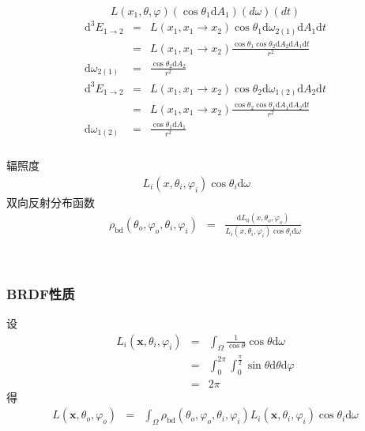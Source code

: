 \documentclass{beamer}
\newcommand{\mathd}{\mathrm{d}}
\newcommand{\nospace}{}
\newcommand{\tmmathbf}[1]{\ensuremath{\boldsymbol{#1}}}
\newcommand{\tmop}[1]{\ensuremath{\operatorname{#1}}}
\begin{document}
{{\begin{frame}
  \frametitle{}
  \[ L (x_1, \theta, \varphi) (\cos \theta_1 \mathd A_1) (d \omega) (d
     \nospace t) \]
  \begin{eqnarray*}
    \mathd^3 E_{1 \rightarrow 2} & = & L (x_1, x_1 \rightarrow x_2) \cos
    \theta_1 \mathd \omega_{2 (1)} \mathd A_1 \mathd t\\
    & = & L (x_1, x_1 \rightarrow x_2) \frac{\cos \theta_1 \cos \theta_2
    \mathd A_2 \mathd A_1 \mathd t}{r^2}\\
    \mathd \omega_{2 (1)} & = & \frac{\cos \theta_2 \mathd A_2}{r^2}\\
    \mathd^3 E_{1 \rightarrow 2} & = & L (x_1, x_1 \rightarrow x_2) \cos
    \theta_2 \mathd \omega_{1 (2)} \mathd A_2 \mathd t\\
    & = & L (x_1, x_1 \rightarrow x_2) \frac{\cos \theta_2 \cos \theta_1
    \mathd A_1 \mathd A_2 \mathd t}{r^2}\\
    \mathd \omega_{1 (2)} & = & \frac{\cos \theta_1 \mathd A_1}{r^2}
  \end{eqnarray*}
\end{frame}

\begin{frame}
  \frametitle{}
  
  辐照度
  \begin{eqnarray*}
    L_i (x, \theta_i, \varphi_i) \cos \theta_i \mathd \omega &  & 
  \end{eqnarray*}
  双向反射分布函数
  \begin{eqnarray*}
    \rho_{\tmop{bd}} (\theta_o, \varphi_o, \theta_i, \varphi_i) & = &
    \frac{\mathd L_0 (x, \theta_o, \varphi_o)}{L_i (x, \theta_i, \varphi_i)
    \cos \theta_i \mathd \omega}
  \end{eqnarray*}
  
  
  \ 
\end{frame}

\begin{frame}
  \frametitle{BRDF性质}
  
  设
  \begin{eqnarray*}
    L_i (\tmmathbf{x}, \theta_i, \varphi_i) & = & \int_{\Omega} \frac{1}{\cos
    \theta} \cos \theta \mathd \omega\\
    & = & \int_0^{2 \pi} \int_0^{\frac{\pi}{2}} \sin \theta \mathd \theta
    \mathd \varphi\\
    & = & 2 \pi
  \end{eqnarray*}
  得
  \begin{eqnarray*}
    L (\tmmathbf{x}, \theta_o, \varphi_o) & = & \int_{\Omega} \rho_{\tmop{bd}}
    (\theta_o, \varphi_o, \theta_i, \varphi_i) L_i (\tmmathbf{x}, \theta_i,
    \varphi_i) \cos \theta_i \mathd \omega
  \end{eqnarray*}
\end{frame}

}}
\end{document}
